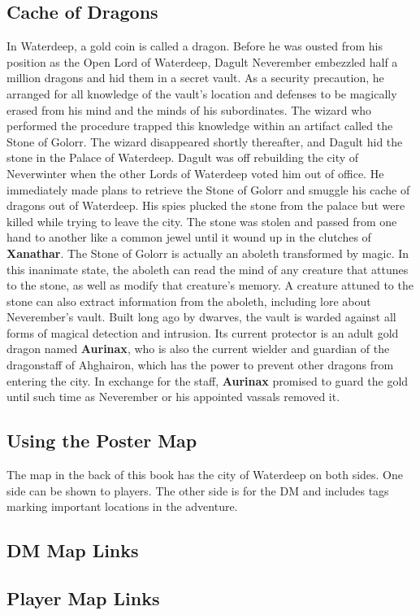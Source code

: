 \documentclass[10pt,a4paper,twoside,twocolumn,openany,nodeprecatedcode]{dndbook}
\begin{document}
\subsection{Cache of Dragons}
In Waterdeep, a gold coin is called a dragon. Before he was ousted from his position as the Open Lord of Waterdeep, Dagult Neverember embezzled half a million dragons and hid them in a secret vault. As a security precaution, he arranged for all knowledge of the vault's location and defenses to be magically erased from his mind and the minds of his subordinates. The wizard who performed the procedure trapped this knowledge within an artifact called the Stone of Golorr. The wizard disappeared shortly thereafter, and Dagult hid the stone in the Palace of Waterdeep.
Dagult was off rebuilding the city of Neverwinter when the other Lords of Waterdeep voted him out of office. He immediately made plans to retrieve the Stone of Golorr and smuggle his cache of dragons out of Waterdeep. His spies plucked the stone from the palace but were killed while trying to leave the city. The stone was stolen and passed from one hand to another like a common jewel until it wound up in the clutches of \textbf{Xanathar}.
The Stone of Golorr is actually an aboleth transformed by magic. In this inanimate state, the aboleth can read the mind of any creature that attunes to the stone, as well as modify that creature's memory. A creature attuned to the stone can also extract information from the aboleth, including lore about Neverember's vault.
Built long ago by dwarves, the vault is warded against all forms of magical detection and intrusion. Its current protector is an adult gold dragon named \textbf{Aurinax}, who is also the current wielder and guardian of the dragonstaff of Ahghairon, which has the power to prevent other dragons from entering the city. In exchange for the staff, \textbf{Aurinax} promised to guard the gold until such time as Neverember or his appointed vassals removed it.
\subsection{Using the Poster Map}
The map in the back of this book has the city of Waterdeep on both sides. One side can be shown to players. The other side is for the DM and includes tags marking important locations in the adventure.
\subsection{DM Map Links}
\subsection{Player Map Links}
\end{document}
